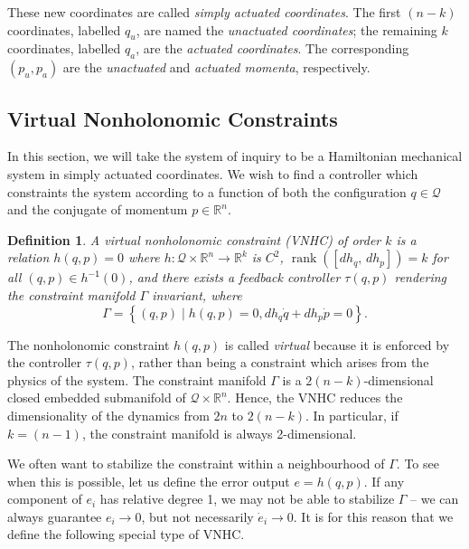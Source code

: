 \documentclass[journal,twoside,web]{ieeecolor}
\newtheorem{defn}[thm]{Definition} %
\DeclareMathOperator{\Rank}{rank}
\newcommand*{\rank}[1]{\Rank\left(#1\right)}
\newcommand*{\inv}{^\mathsf{-1}}
\newcommand*{\R}{\mathbb{R}}
\begin{document}
These new coordinates are called 
\textit{simply actuated coordinates}.
The first \((n-k)\) coordinates, labelled \(q_u\), are named
the \textit{unactuated coordinates}; 
the remaining \(k\) coordinates, labelled \(q_a\), are the
\textit{actuated coordinates}.
The corresponding \((p_u, p_a)\) are the \textit{unactuated} and 
\textit{actuated momenta}, respectively.

\subsection{Virtual Nonholonomic Constraints}

In this section, we will take the system of inquiry to be a Hamiltonian
mechanical system in simply actuated coordinates.
We wish to find a controller which constraints the system according to a
function of both the configuration \(q \in \mathcal{Q}\) and the conjugate of
momentum \(p \in \R^n\).

\begin{defn}\label{defn:vnhc}
    A \textit{virtual nonholonomic constraint} (VNHC) \textit{of order \(k\)} is a
    relation \(h(q,p) = 0\) where \(h : \mathcal{Q}\times\R^n \rightarrow \R^k\) is
    \(C^2\), \(\rank{\left[ dh_q,\, dh_p \right]} = k\) for all 
    \((q,p) \in h\inv(0)\), and there exists a feedback controller \(\tau(q,p)\)
    rendering the \textit{constraint manifold} \(\Gamma\) invariant,
    where
    \[
        \Gamma = \left\{(q,p) \mid h(q,p) = 0, dh_q \dot{q} + dh_p \dot{p} = 0\right\}
        .
    \]
\end{defn}

The nonholonomic constraint \(h(q,p)\) is called \textit{virtual} because it is
enforced by the controller \(\tau(q,p)\), rather than being a constraint which
arises from the physics of the system.
The constraint manifold \(\Gamma\) is a \(2(n-k)\)-dimensional
closed embedded submanifold of \(\mathcal{Q} \times \R^n\).
Hence, the VNHC reduces the dimensionality of the dynamics from \(2n\) to
\(2(n-k)\). 
In particular, if \(k = (n-1)\), the constraint manifold is always
2-dimensional. 

We often want to stabilize the constraint within a neighbourhood of \(\Gamma\).
To see when this is possible, let us define the error output \(e = h(q,p)\).
If any component of \(e_i\) has relative degree 1, we may not be able
to stabilize \(\Gamma\) -- we can always guarantee \(e_i \to 0\), but not
necessarily \(\dot{e}_i \to 0\).
It is for this reason that we define the following special type of VNHC.
\end{document}
